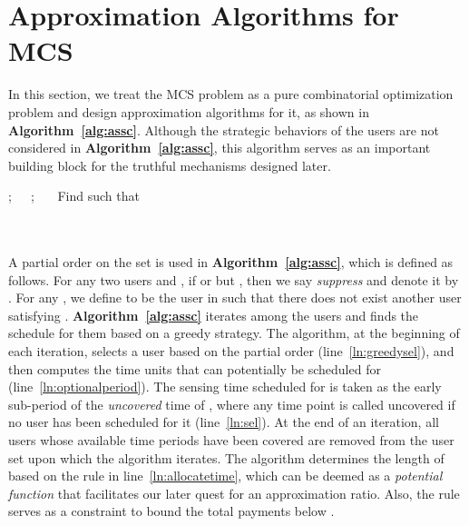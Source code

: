 \documentclass[10pt,journal,compsoc]{IEEEtran}
\begin{document}
\section{Approximation Algorithms for MCS} \label{sec:appro}
In this section, we treat the MCS problem as a pure combinatorial optimization problem and design approximation algorithms for it, as shown in \textbf{Algorithm~\ref{alg:assc}}. Although the strategic behaviors of the users are not considered in \textbf{Algorithm~\ref{alg:assc}}, this algorithm serves as an important building block for the truthful mechanisms designed later.
\begin{algorithm}[htb]
;~~~;~~~
    \lFor{ \KwTo }{
        ~\\
    }
     {\label{ln:lpbegin}
        Find  such that  \label{ln:greedysel}~\\
\\ \label{ln:optionalperiod}
         \label{ln:allocatetime}~\\
    }\label{ln:lpend}
    \lFor{ \KwTo }{
         \label{ln:ir}~\\
    }
\Return{}
    \caption{}
    \label{alg:assc}
  \end{algorithm}

  A partial order  on the set  is used in \textbf{Algorithm~\ref{alg:assc}}, which is defined as follows. For any two users  and , if  or  but , then we say  \textit{suppress}  and denote it by . For any , we define  to be the user in  such that there does not exist another user  satisfying . 
\textbf{Algorithm~\ref{alg:assc}} iterates among the users and finds the schedule for them based on a greedy strategy. The algorithm, at the beginning of each iteration, selects a user  based on the partial order  (line~\ref{ln:greedysel}), and then computes the time units that can potentially be scheduled for  (line~\ref{ln:optionalperiod}). The sensing time  scheduled for  is taken as the early sub-period of the \textit{uncovered} time of , where any time point is called uncovered if no user has been scheduled for it (line~\ref{ln:sel}). At the end of an iteration, all users whose available time periods have been covered are removed from the user set  upon which the algorithm iterates.
The algorithm determines the length of  based on the rule in line~\ref{ln:allocatetime}, which can be deemed as a \textit{potential function} \cite{Cormen2001} that facilitates our later quest for an approximation ratio. Also, the rule serves as a constraint to bound the total payments below .
\end{document}
